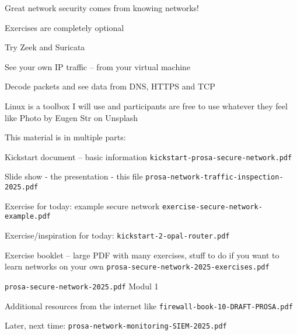 \documentclass[Screen16to9,17pt]{foils}
\begin{document}
\vskip 5mm

\centerline{\Large Great network security comes from knowing networks!}



Exercises are completely optional

\begin{list2}
\item Try Zeek and Suricata
\item See your own IP traffic -- from your virtual machine
\item Decode packets and see data from DNS, HTTPS and TCP
\end{list2}

Linux is a toolbox I will use and participants are free to use whatever they feel like
\hfill Photo by Eugen Str on Unsplash





\begin{list2}
\item This material is in multiple parts:
\item Kickstart document -- basic information
\verb+kickstart-prosa-secure-network.pdf+
\item Slide show - the presentation - this file
\verb+prosa-network-traffic-inspection-2025.pdf+
\item Exercise for today: example secure network \verb+exercise-secure-network-example.pdf+
\item Exercise/inspiration for today: \verb+kickstart-2-opal-router.pdf+
\item Exercise booklet -- large PDF with many exercises, stuff to do if you want to learn networks on your own
\verb+prosa-secure-network-2025-exercises.pdf+
\item \verb+prosa-secure-network-2025.pdf+ Modul 1
\item Additional resources from the internet like \verb+firewall-book-10-DRAFT-PROSA.pdf+
\item Later, next time:
\verb+prosa-network-monitoring-SIEM-2025.pdf+
\end{list2}


\end{document}

